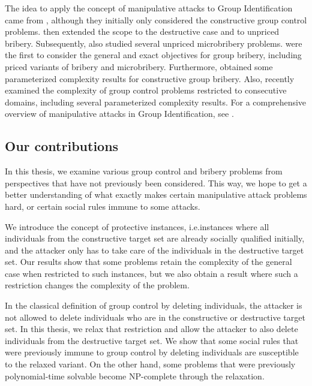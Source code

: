 \documentclass[
    12pt,               %
    a4paper,            %
    bibtotoc,           %
    pointlessnumbers,   %
    ngerman,            %
    titlepage,          %
    leqno,              %
    ]{scrarticle}       %
\begin{document}
The idea to apply the concept of manipulative attacks to Group Identification came from \textcite{YD18}, although they initially only considered the constructive group control problems. \textcite{ERY20} then extended the scope to the destructive case and to unpriced bribery. Subsequently, \textcite{EY20} also studied several unpriced microbribery problems. \textcite{BBKL20} were the first to consider the general and exact objectives for group bribery, including priced variants of bribery and microbribery. Furthermore, \textcite{BBKL21} obtained some parameterized complexity results for constructive group bribery. Also, \textcite{YD22} recently examined the complexity of group control problems restricted to consecutive domains, including several parameterized complexity results. For a comprehensive overview of manipulative attacks in Group Identification, see \textcite{J22}.



\subsection{Our contributions}
\label{sec:intro_contributions}

In this thesis, we examine various group control and bribery problems from perspectives that have not previously been considered. This way, we hope to get a better understanding of what exactly makes certain manipulative attack problems hard, or certain social rules immune to some attacks.

We introduce the concept of protective instances, i.e.\@ instances where all individuals from the constructive target set are already socially qualified initially, and the attacker only has to take care of the individuals in the destructive target set. Our results show that some problems retain the complexity of the general case when restricted to such instances, but we also obtain a result where such a restriction changes the complexity of the problem.

In the classical definition of group control by deleting individuals, the attacker is not allowed to delete individuals who are in the constructive or destructive target set. In this thesis, we relax that restriction and allow the attacker to also delete individuals from the destructive target set. We show that some social rules that were previously immune to group control by deleting individuals are susceptible to the relaxed variant. On the other hand, some problems that were previously polynomial-time solvable become NP-complete through the relaxation.
\end{document}
